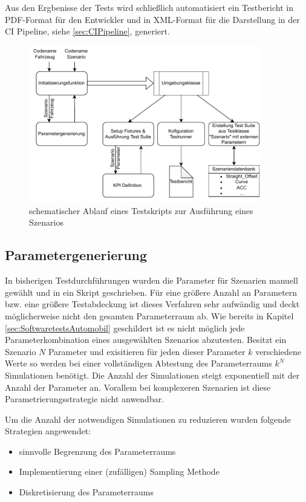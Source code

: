 \noindent Aus den Ergbenisse der Tests wird schließlich automatisiert ein Testbericht in PDF-Format für den Entwickler und in XML-Format für die Darstellung in der CI Pipeline, siehe \ref{sec:CIPipeline}, generiert.

\begin{figure}
    \centering
    \includegraphics[width=0.9\textwidth]{figures/3_Implementierung/Ablauf_TestSkript.drawio.pdf}
    \caption{schematischer Ablauf eines Testskripts zur Ausführung eines Szenarios}
    \label{fig:Testskript_Ablauf}
\end{figure}

\subsection{Parametergenerierung} \label{subsec:Parametergenerierung}
In bisherigen Testdurchführungen wurden die Parameter für Szenarien manuell gewählt und in ein Skript geschrieben. Für eine größere Anzahl an Parametern bzw. eine größere Testabdeckung ist dieses Verfahren sehr aufwändig und deckt möglicherweise nicht den gesamten Parameterraum ab. Wie bereits in Kapitel \ref{sec:SoftwaretestsAutomobil} geschildert ist es nicht möglich jede Parameterkombination eines ausgewählten Szenarios abzutesten. Besitzt ein Szenario $N$ Parameter und exisitieren für jeden dieser Parameter $k$ verschiedene Werte so werden bei einer vollständigen Abtestung des Parameterraums $k^{N}$ Simulationen benötigt. Die Anzahl der Simulationen steigt exponentiell mit der Anzahl der Parameter an. Vorallem bei komplexeren Szenarien ist diese Parametrierungsstrategie nicht anwendbar.

Um die Anzahl der notwendigen Simulationen zu reduzieren wurden folgende Strategien angewendet:
\begin{itemize}
    \item sinnvolle Begrenzung des Parameterraums
    \item Implementierung einer (zufälligen) Sampling Methode
    \item Diskretisierung des Parameterraums
\end{itemize}

